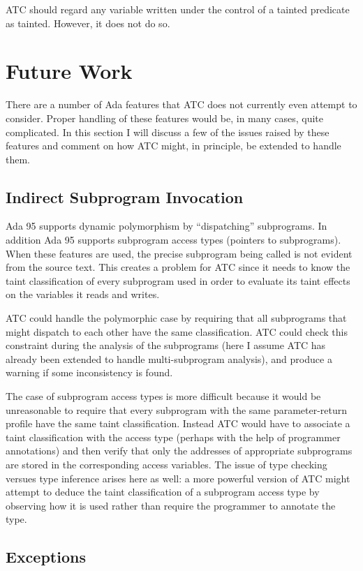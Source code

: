 \documentclass{article}
\begin{document}
ATC should regard any variable written under the control of a tainted predicate as tainted. However, it does not do so.

\section{Future Work}

There are a number of Ada features that ATC does not currently even attempt to consider. Proper handling of these features would be, in many cases, quite complicated. In this section I will discuss a few of the issues raised by these features and comment on how ATC might, in principle, be extended to handle them.

\subsection{Indirect Subprogram Invocation}

Ada 95 supports dynamic polymorphism by ``dispatching'' subprograms. In addition Ada 95 supports subprogram access types (pointers to subprograms). When these features are used, the precise subprogram being called is not evident from the source text. This creates a problem for ATC since it needs to know the taint classification of every subprogram used in order to evaluate its taint effects on the variables it reads and writes.

ATC could handle the polymorphic case by requiring that all subprograms that might dispatch to each other have the same classification. ATC could check this constraint during the analysis of the subprograms (here I assume ATC has already been extended to handle multi-subprogram analysis), and produce a warning if some inconsistency is found.

The case of subprogram access types is more difficult because it would be unreasonable to require that every subprogram with the same parameter-return profile have the same taint classification. Instead ATC would have to associate a taint classification with the access type (perhaps with the help of programmer annotations) and then verify that only the addresses of appropriate subprograms are stored in the corresponding access variables. The issue of type checking versues type inference arises here as well: a more powerful version of ATC might attempt to deduce the taint classification of a subprogram access type by observing how it is used rather than require the programmer to annotate the type.

\subsection{Exceptions}
\end{document}
